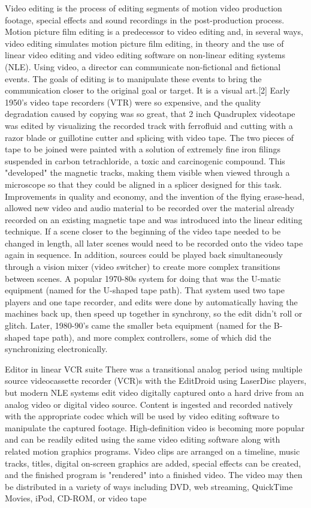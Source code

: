 Video editing is the process of editing segments of motion video production footage, special effects and sound recordings in the post-production process. Motion picture film editing is a predecessor to video editing and, in several ways, video editing simulates motion picture film editing, in theory and the use of linear video editing and video editing software on non-linear editing systems (NLE). Using video, a director can communicate non-fictional and fictional events. The goals of editing is to manipulate these events to bring the communication closer to the original goal or target. It is a visual art.[2]
Early 1950's video tape recorders (VTR) were so expensive, and the quality degradation caused by copying was so great, that 2 inch Quadruplex videotape was edited by visualizing the recorded track with ferrofluid and cutting with a razor blade or guillotine cutter and splicing with video tape. The two pieces of tape to be joined were painted with a solution of extremely fine iron filings suspended in carbon tetrachloride, a toxic and carcinogenic compound. This "developed" the magnetic tracks, making them visible when viewed through a microscope so that they could be aligned in a splicer designed for this task.
Improvements in quality and economy, and the invention of the flying erase-head, allowed new video and audio material to be recorded over the material already recorded on an existing magnetic tape and was introduced into the linear editing technique. If a scene closer to the beginning of the video tape needed to be changed in length, all later scenes would need to be recorded onto the video tape again in sequence. In addition, sources could be played back simultaneously through a vision mixer (video switcher) to create more complex transitions between scenes. A popular 1970-80s system for doing that was the U-matic equipment (named for the U-shaped tape path). That system used two tape players and one tape recorder, and edits were done by automatically having the machines back up, then speed up together in synchrony, so the edit didn't roll or glitch. Later, 1980-90's came the smaller beta equipment (named for the B-shaped tape path), and more complex controllers, some of which did the synchronizing electronically.

Editor in linear VCR suite
There was a transitional analog period using multiple source videocassette recorder (VCR)s with the EditDroid using LaserDisc players, but modern NLE systems edit video digitally captured onto a hard drive from an analog video or digital video source. Content is ingested and recorded natively with the appropriate codec which will be used by video editing software to manipulate the captured footage. High-definition video is becoming more popular and can be readily edited using the same video editing software along with related motion graphics programs. Video clips are arranged on a timeline, music tracks, titles, digital on-screen graphics are added, special effects can be created, and the finished program is "rendered" into a finished video. The video may then be distributed in a variety of ways including DVD, web streaming, QuickTime Movies, iPod, CD-ROM, or video tape